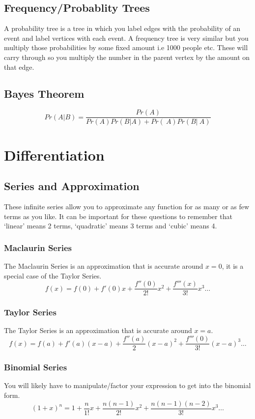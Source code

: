 \documentclass[12pt] {article}
\begin{document}
\subsection*{Frequency/Probablity Trees}
A probability tree is a tree in which you label edges with the probability of an event
and label vertices with each event. A frequency tree is very similar but you multiply
those probabilities by some fixed amount i.e 1000 people etc. These will carry through so you
multiply the number in the parent vertex by the amount on that edge. 

\subsection*{Bayes Theorem}
\begin{equation*}
  Pr(A \vert B) = \frac{Pr(A)}{Pr(A)Pr(B \vert A) + Pr(~A)Pr(B \vert ~A)}
\end{equation*}

\section{Differentiation}
\subsection*{Series and Approximation}
These infinite series allow you to approximate any function for as many or as few terms as you like.
It can be important for these questions to remember that `linear' means 2 terms, `quadratic' means 3 terms and `cubic' means 4.
\subsubsection*{Maclaurin Series}
The Maclaurin Series is an approximation that is accurate around $x=0$, it is a special case of the Taylor Series.
\begin{equation*}
  f(x)=f(0)+f'(0)x+\frac{f''(0)}{2!}x^2+\frac{f'''(x)}{3!}x^3 \dotsc
\end{equation*}
\subsubsection*{Taylor Series}
The Taylor Series is an approximation that is accurate around $x=a$.
\begin{equation*}
  f(x) = f(a) + f'(a)(x-a) + \frac{f''(a)}{2}(x-a)^2 + \frac{f'''(0)}{3!}(x-a)^3 \dotsc
\end{equation*}
\subsubsection*{Binomial Series}
You will likely have to manipulate/factor your expression to get into the binomial form.
\begin{equation*}
  (1+x)^n = 1 + \frac{n}{1!}x + \frac{n(n-1)}{2!}x^2 + \frac{n(n-1)(n-2)}{3!}x^3 \dotsc
\end{equation*}
\end{document}
